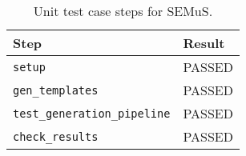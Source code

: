 
\setlength\LTleft{0pt}
\setlength\LTright{0pt}

\scriptsize

\begin{longtable}{|p{4cm}|p{4cm}|}

\caption{Unit test case steps for SEMuS.}
\label{table:matrix:semus} \\

\hline
\textbf{Step}	&	\textbf{Result}	\\
\hline
\texttt{setup}&PASSED\\

\texttt{gen\_templates}&PASSED\\

\texttt{test\_generation\_pipeline}&PASSED\\

\texttt{check\_results}&PASSED\\
\hline
\end{longtable}
\normalsize
